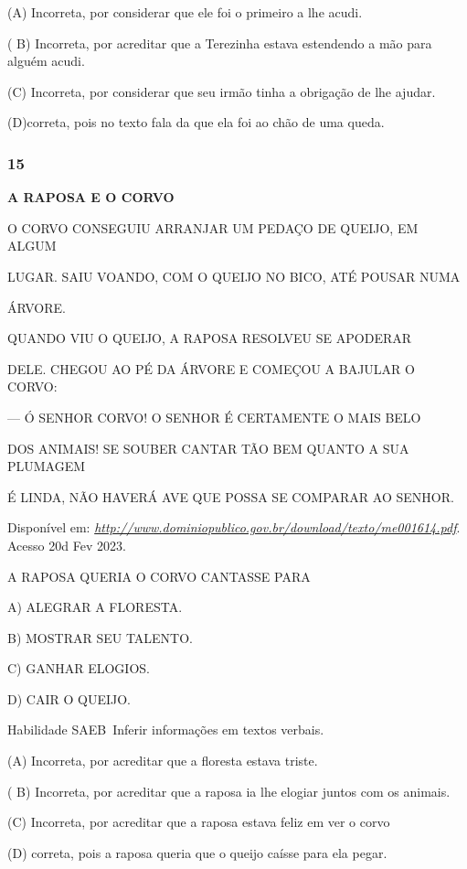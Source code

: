 (A) Incorreta, por considerar que ele foi o primeiro a lhe acudi.

( B) Incorreta, por acreditar que a Terezinha estava estendendo a mão
para alguém acudi.

(C) Incorreta, por considerar que seu irmão tinha a obrigação de lhe
ajudar.

(D)correta, pois no texto fala da que ela foi ao chão de uma queda.

\subsubsection{15 }\label{section-71}

\textbf{A RAPOSA E O CORVO}

O CORVO CONSEGUIU ARRANJAR UM PEDAÇO DE QUEIJO, EM ALGUM

LUGAR. SAIU VOANDO, COM O QUEIJO NO BICO, ATÉ POUSAR NUMA

ÁRVORE.

QUANDO VIU O QUEIJO, A RAPOSA RESOLVEU SE APODERAR

DELE. CHEGOU AO PÉ DA ÁRVORE E COMEÇOU A BAJULAR O CORVO:

--- Ó SENHOR CORVO! O SENHOR É CERTAMENTE O MAIS BELO

DOS ANIMAIS! SE SOUBER CANTAR TÃO BEM QUANTO A SUA PLUMAGEM

É LINDA, NÃO HAVERÁ AVE QUE POSSA SE COMPARAR AO SENHOR.

Disponível em:
\href{http://www.dominiopublico.gov.br/download/texto/me001614.pdf}{\emph{http://www.dominiopublico.gov.br/download/texto/me001614.pdf}}.
Acesso 20d Fev 2023.

A RAPOSA QUERIA O CORVO CANTASSE PARA

A) ALEGRAR A FLORESTA.

B) MOSTRAR SEU TALENTO.

C) GANHAR ELOGIOS.

D) CAIR O QUEIJO.

Habilidade SAEB~Inferir informações em textos verbais.

(A) Incorreta, por acreditar que a floresta estava triste.

( B) Incorreta, por acreditar que a raposa ia lhe elogiar juntos com os
animais.

(C) Incorreta, por acreditar que a raposa estava feliz em ver o corvo

(D) correta, pois a raposa queria que o queijo caísse para ela
pegar.\protect\hypertarget{_heading=h.jen2jvep4ux3}{}{}

